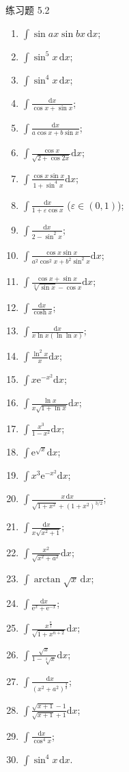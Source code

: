 \begin{exblock}{练习题 5.2}
\begin{enumerate}[label=(\arabic*)]
    \item $\int\sin ax\sin bx\,\mathrm{d}x$;
    \item $\int\sin^{5}x\,\mathrm{d}x$;
    \item $\int\sin^{4}x\,\mathrm{d}x$;
    \item $\int\frac{\mathrm{d}x}{\cos x+\sin x}$;
    \item $\int\frac{\mathrm{d}x}{a\cos x+b\sin x}$;
    \item $\int\frac{\cos x}{\sqrt{2+\cos 2x}}\mathrm{d}x$;
    \item $\int\frac{\cos x\sin x}{1+\sin^{4}x}\mathrm{d}x$;
    \item $\int\frac{\mathrm{d}x}{1+\varepsilon\cos x}$ ($\varepsilon\in(0,1)$);
    \item $\int\frac{\mathrm{d}x}{2-\sin^{2}x}$;
    \item $\int\frac{\cos x\sin x}{a^{2}\cos^{2}x+b^{2}\sin^{2}x}\mathrm{d}x$;
    \item $\int\frac{\cos x+\sin x}{\sqrt[3]{\sin x}-\cos x}\mathrm{d}x$;
    \item $\int\frac{\mathrm{d}x}{\cosh x}$;
    \item $\int\frac{\mathrm{d}x}{x\ln x(\ln\ln x)}$;
    \item $\int\frac{\ln^{2}x}{x}\mathrm{d}x$;
    \item $\int x\mathrm{e}^{-x^{2}}\mathrm{d}x$;
    \item $\int\frac{\ln x}{x\sqrt{1+\ln x}}\mathrm{d}x$;
    \item $\int\frac{x^{3}}{1-x^{2}}\mathrm{d}x$;
    \item $\int\mathrm{e}^{\sqrt{x}}\mathrm{d}x$;
    \item $\int x^{3}\mathrm{e}^{-x^{2}}\mathrm{d}x$;
    \item $\int\frac{x\,\mathrm{d}x}{\sqrt{1+x^{2}}+(1+x^{2})^{3/2}}$;
    \item $\int\frac{\mathrm{d}x}{x\sqrt{x^{2}+1}}$;
    \item $\int\frac{x^{2}}{\sqrt{x^{2}+a^{2}}}\mathrm{d}x$;
    \item $\int\arctan\sqrt{x}\,\mathrm{d}x$;
    \item $\int\frac{\mathrm{d}x}{\mathrm{e}^{x}+\mathrm{e}^{-x}}$;
    \item $\int\frac{x^{\frac{n}{2}}}{\sqrt{1+x^{n+2}}}\mathrm{d}x$;
    \item $\int\frac{\sqrt{x}}{1-\sqrt[3]{x}}\mathrm{d}x$;
    \item $\int\frac{\mathrm{d}x}{(x^{2}+a^{2})^{\frac{3}{2}}}$;
    \item $\int\frac{\sqrt{x+1}-1}{\sqrt{x+1}+1}\mathrm{d}x$;
    \item $\int\frac{\mathrm{d}x}{\cos^{4}x}$;
    \item $\int\sin^{4}x\,\mathrm{d}x$.
  \end{enumerate}


\end{exblock}
